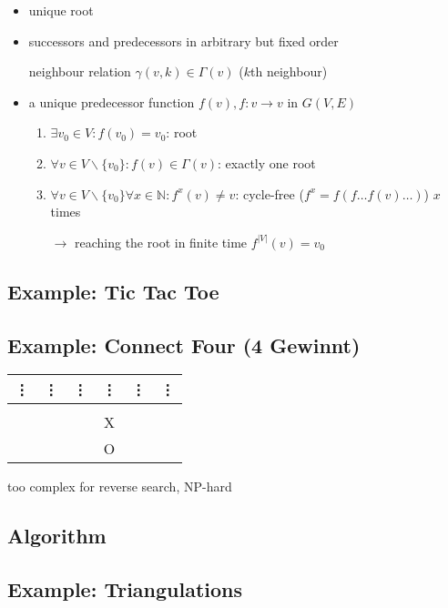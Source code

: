\documentclass[11pt]{article}
\begin{document}
\begin{itemize}
\item unique root
\item successors and predecessors in arbitrary but fixed order

	neighbour relation $ \gamma(v, k) \in \Gamma(v) $ ($ k $th neighbour)
\item a unique predecessor function $ f(v), f: v \rightarrow v $ in $ G(V, E) $
	\begin{enumerate}
	\item $ \exists v_0 \in V: f(v_0) = v_0 $: root
	\item $ \forall v \in V \backslash \{v_0\}: f(v) \in \Gamma(v) $: exactly one root
	\item $ \forall v \in V \backslash \{v_0\} \forall x \in \mathbb{N}: f^x(v) \neq v $: cycle-free ($ f^x = f(f \dots f(v) \dots) $) $ x $ times
	
		$ \rightarrow $ reaching the root in finite time $ f^{|V|}(v) = v_0 $
	\end{enumerate}

\end{itemize}

\subsection{Example: Tic Tac Toe}

\subsection{Example: Connect Four (4 Gewinnt)}

\begin{tabular}{| c | c | c | c | c | c |}
\vdots & \vdots & \vdots & \vdots & \vdots & \vdots \\
\hline
& & & & & \\
\hline
& & & X & & \\
\hline
& & & O & & \\
\hline
\end{tabular} \newline

too complex for reverse search, NP-hard

\subsection{Algorithm}

\subsection{Example: Triangulations}
\end{document}
